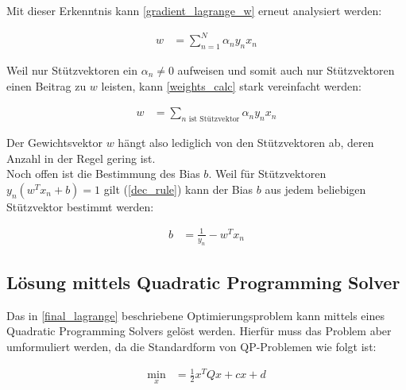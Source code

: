 \documentclass[a4paper,11pt,twoside]{scrreprt}
\begin{document}
Mit dieser Erkenntnis kann \autoref{gradient_lagrange_w} erneut analysiert werden:

\begin{equation} \label{weights_calc}
	\begin{aligned}
		w &= \sum_{n=1}^{N} \alpha_{n} y_{n} x_{n}
	\end{aligned}
\end{equation}

Weil nur Stützvektoren ein $\alpha_{n} \neq 0$ aufweisen und somit auch nur Stützvektoren einen Beitrag zu $w$ leisten, kann \autoref{weights_calc} stark vereinfacht werden:

\begin{equation} \label{weights_calc2}
	\begin{aligned}
		w &= \sum_{n \text{ ist Stützvektor}} \alpha_{n} y_{n} x_{n}
	\end{aligned}
\end{equation}

Der Gewichtsvektor $w$ hängt also lediglich von den Stützvektoren ab, deren Anzahl in der Regel gering ist.\\


Noch offen ist die Bestimmung des Bias $b$. Weil für Stützvektoren $y_n (w^{T} x_{n} + b) = 1$ gilt (\autoref{dec_rule}) kann der Bias $b$ aus jedem beliebigen Stützvektor bestimmt werden:

\begin{equation} \label{bias_calc}
	\begin{aligned}
		b &= \frac{1}{y_{n}} - w^{T} x_{n}
	\end{aligned}
\end{equation}

\subsection{Lösung mittels Quadratic Programming Solver}

Das in \autoref{final_lagrange} beschriebene Optimierungsproblem kann mittels eines Quadratic Programming Solvers gelöst werden. Hierfür muss das Problem aber umformuliert werden, da die Standardform von QP-Problemen wie folgt ist:

\begin{equation} \label{std_QP_problem}
	\begin{aligned}
		\min_{x} &= \frac{1}{2} x^{T} Q x + c x + d 
	\end{aligned}
\end{equation}
\end{document}
